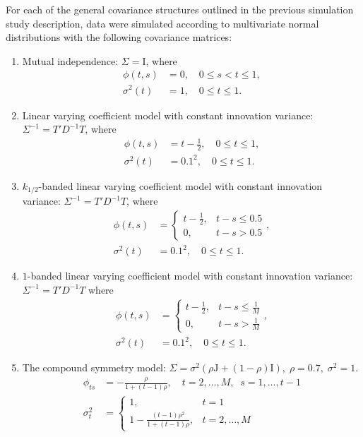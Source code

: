 
For each of the general covariance structures outlined in the previous simulation study description, data were simulated according to multivariate normal distributions with the following covariance matrices: 
\begin{enumerate} 
\item\label{item:cov-type-1} Mutual independence: $\Sigma = \mathrm{I}$, where 
\begin{align*}
\phi\left(t,s\right) &= 0, \quad 0 \le s < t \le 1,\\ 
\sigma^2\left(t\right) &= 1, \quad 0 \le t \le 1.
\end{align*}
\item \label{item:cov-type-2} Linear varying coefficient model with constant innovation variance: $\Sigma^{-1} = T' D^{-1} T$, where 
\begin{align*}
\phi\left(t,s\right) &= t - \frac{1}{2},  \quad 0 \le t \le 1, \\
\sigma^2\left(t\right) &= 0.1^2,  \quad 0 \le t \le 1.
\end{align*}
{}
\item \label{item:cov-type-3} $k_{1/2}$-banded linear varying coefficient model with constant innovation variance: $\Sigma^{-1} = T' D^{-1} T$, where
\begin{align*}
\phi\left(t,s\right) &= \left\{\begin{array}{ll} t - \frac{1}{2}, & t - s \le 0.5\\ 
0, & t - s > 0.5\end{array}\right.,\\
\sigma^2\left(t\right) &= 0.1^2, \quad 0 \le t \le 1.
\end{align*}
\item \label{item:cov-type-4} $1$-banded linear varying coefficient model with constant innovation variance: $\Sigma^{-1} = T' D^{-1} T$ where 
\begin{align*}
\phi\left(t,s\right) &= \left\{\begin{array}{ll} t - \frac{1}{2}, & t - s \le \frac{1}{M}\\ 0, & t - s > \frac{1}{M}\end{array}\right.,\\
\sigma^2\left(t\right) &= 0.1^2, \quad 0 \le t \le 1.
\end{align*}
\item \label{item:cov-type-5} The compound symmetry model: $\Sigma = \sigma^2\left(\rho \mathrm{J} + \left(1-\rho\right)\mathrm{I}\right),\; \rho=0.7,\;\sigma^2=1$. 
\begin{align*}
\phi_{ts} &= -\frac{\rho}{1 + \left(t-1\right)\rho}, \quad t = 2, \dots, M,\;\; s = 1, \dots, t-1\\
\sigma_t^2 &= \left\{\begin{array}{ll} 1, & t = 1\\ 1 -\frac{\left(t-1\right)\rho^2}{1 + \left(t-1\right)\rho}, & t = 2, \dots, M \end{array}\right.
\end{align*}
\end{enumerate}



